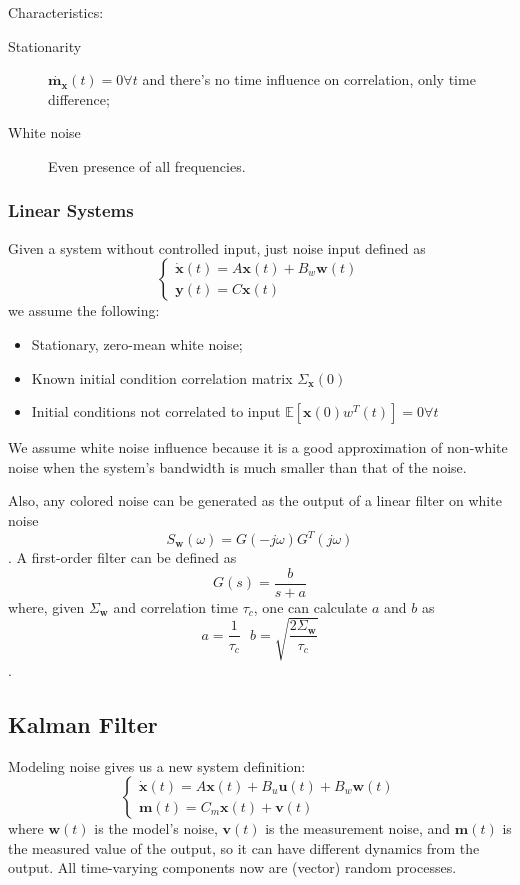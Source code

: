 \documentclass[a4paper]{report}
\begin{document}
Characteristics:
\begin{description}
\item[Stationarity] $\dot{\bm{m}_{\bm{x}}}(t) = 0 \forall t$ and there's no time influence on correlation, only time difference;
\item[White noise] Even presence of all frequencies.
\end{description}

\subsubsection*{Linear Systems}

Given a system without controlled input, just noise input defined as \[
\begin{cases}
    \dot{\bm{x}}(t) = A\bm{x}(t) + B_w \bm{w}(t) \\
    \bm{y}(t) = C\bm{x}(t)
\end{cases}
\] we assume the following:
\begin{itemize}
    \item Stationary, zero-mean white noise;
	\item Known initial condition correlation matrix $\Sigma_{\bm{x}}(0)$
	\item Initial conditions not correlated to input $\mathbb{E}[\bm{x}(0)w^{T}(t)] = 0 \forall t$
\end{itemize}

\begin{note}
    We assume white noise influence because it is a good approximation of non-white noise when the system's bandwidth is much smaller than that of the noise.

    Also, any colored noise can be generated as the output of a linear filter on white noise \[
	S_{\bm{w}}(\omega) = G(-j\omega)G^{T}(j\omega)
    \]. A first-order filter can be defined as \[
    G(s) = \frac{b}{s+a}
    \] where, given $\Sigma_{\bm{w}}$ and correlation time $\tau_c$, one can calculate $a$ and $b$ as \[
    a = \frac{1}{\tau_c} \text{   } b = \sqrt{\frac{2\Sigma_{\bm{w}}}{\tau_c}} 
    \].
\end{note}

\subsection*{Kalman Filter}

Modeling noise gives us a new system definition: \[
\begin{cases}
    \dot{\bm{x}}(t) = A\bm{x}(t) + B_u\bm{u}(t) + B_w\bm{w}(t) \\
    \bm{m}(t) = C_m\bm{x}(t) + \bm{v}(t)
\end{cases}
\] 
where $\bm{w}(t)$ is the model's noise, $\bm{v}(t)$ is the measurement noise, and $\bm{m}(t)$ is the measured value of the output, so it can have different dynamics from the output. All time-varying components now are (vector) random processes.
\end{document}
